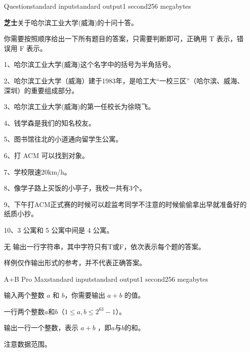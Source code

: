 \documentclass[12pt,a4paper,oneside]{article}
\begin{document}
    \begin{problem}{Question}{standard input}{standard output}{1 second}{256 megabytes}
	
      \textbf{芝士}关于哈尔滨工业大学(威海)的十问十答。
      
      你需要按照顺序给出一下所有题目的答案，只需要判断即可，正确用 T 表示，错误用 F 表示。
      
      1、哈尔滨工业大学(威海)这个名字中的括号为半角括号。
      
      2、哈尔滨工业大学（威海）建于1983年，是哈工大“一校三区”（哈尔滨、威海、深圳）的重要组成部分。
      
      3、哈尔滨工业大学(威海)的第一任校长为徐晓飞。
      
      4、钱学森是我们的知名校友。
      
      5、图书馆往北的小道通向留学生公寓。
      
      6、打 ACM 可以找到对象。
      
      7、学校限速20km/h。
      
      8、像学子路上买饭的小亭子，我校一共有3个。
      
      9、下午打ACM正式赛的时候可以趁监考同学不注意的时候偷偷拿出早就准备好的纸质小抄。
      
      10、3 公寓和 5 公寓中间是 4 公寓。



	\InputFile
	无
        \OutputFile
	输出一行字符串，其中字符只有T或F，依次表示每个题的答案。
	\Example
	\begin{example}
	\end{example}
        
        \Note
        样例仅作输出形式的参考，并不代表正确答案。
	
\end{problem}
	



    \begin{problem}{A+B Pro Max}{standard input}{standard output}{1 second}{256 megabytes}
	
    	
        输入两个整数 $a$ 和 $b$，你需要输出 $a + b$ 的值。
        \InputFile

        一行两个整数$a$和$b$（$1 \le a,b \le 2^{63} - 1$）。
        
        \OutputFile
	输出一行一个整数，表示 $a+b$ ，即$a$与$b$的和。
	\Example
	
	\begin{example}
	\exmpfile{B1/1.in}{B1/1.ans}%
	\end{example}

        \Note
        注意数据范围。
	\end{problem}
\end{document}
